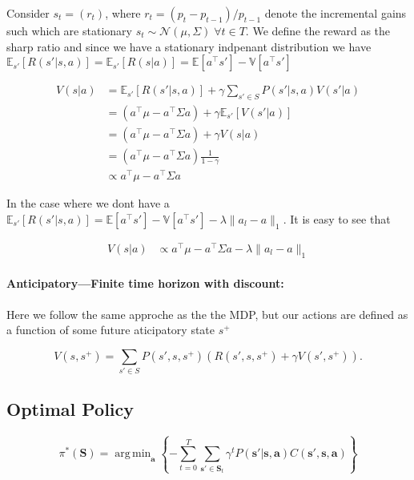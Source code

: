 \documentclass[]{usiinfdocprop}
\newcommand{\E}[1]{\mathbb{E} \left[#1 \right]}
\newcommand{\EO}[2]{\mathbb{E}_{#1} \left[#2 \right]}
\newcommand{\V}[1]{\mathbb{V} \left[#1 \right]}
\DeclareMathOperator*{\argmin}{arg\,min}
\newcommand{\bb}[1]{\boldsymbol{\mathbf{#1}}}
\begin{document}
Consider $s_t=(r_t)$, where $r_t=(p_{t}-p_{t-1})/p_{t-1}$ denote the incremental gains such which are stationary  $s_t \sim \mathcal{N}(\mu,\Sigma) \; \forall t \in T$. We define the reward as the sharp ratio and since we have a stationary indpenant distribution we have $\EO{s'}{R(s'|s,a)}=\EO{s'}{R(s|a)}= \E{a^\top s'}-\V{a^\top s'}$

\begin{align}
    V(s|a) &=  \EO{s'}{R(s'|s,a)} + \gamma \sum_{s' \in S} P(s'|s,a) V(s'|a) \\
           &=  (a^\top \mu - a^\top \Sigma a) + \gamma \EO{s'}{V(s'|a)}\\
           &=  (a^\top \mu - a^\top \Sigma a) + \gamma  V(s|a)\\
           &=  (a^\top \mu - a^\top \Sigma a)  \frac{1}{1-\gamma}\\
           &\propto  a^\top \mu - a^\top \Sigma a
\end{align}


In the case where we dont have a 
$\EO{s'}{R(s'|s,a)}= \E{a^\top s'}-\V{a^\top s'} - \lambda \|a_l - a\|_{1}$. It is easy to see that 


\begin{align}
    V(s|a) &\propto   a^\top \mu - a^\top \Sigma a -  \lambda \|a_l - a\|_{1}
\end{align}



\newpage


\paragraph{Anticipatory---Finite time horizon with discount:}
Here we follow the same approche as the the MDP, but our actions are defined as a function of some future aticipatory state $s^+$


\begin{equation}
    V(s,s^+)= \sum_{s' \in S} P(s',s,s^+) \left( R( s',s,s^+) + \gamma V(s',s^+) \right).
\end{equation}










\subsection{Optimal Policy}
\begin{equation}
 \pi^* (\bb{S}) = \argmin_{\bb{a}} \left\{  -  \sum^{T}_{t=0}   \sum_{\bb{s}' \in \bb{S}_t} \gamma^t P(\bb{s}'|\bb{s},\bb{a}) C(\bb{s}',\bb{s},\bb{a})  \right\} 
\end{equation}
\end{document}
